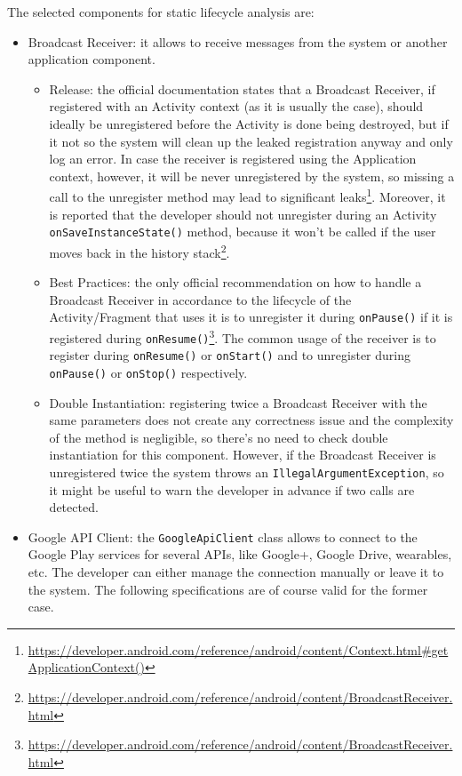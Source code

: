 \documentclass[11pt,a4paper,notitlepage]{article}
\begin{document}
The selected components for static lifecycle analysis are:
\begin{itemize}
	\item Broadcast Receiver: it allows to receive messages from the system or another application component.
	\begin{itemize}
		\item Release: the official documentation states that a Broadcast Receiver, if registered with an Activity context (as it is usually the case), should ideally be unregistered before the Activity is done being destroyed, but if it not so the system will clean up the leaked registration anyway and only log an error. In case the receiver is registered using the Application context, however, it will be never unregistered by the system, so missing a call to the unregister method may lead to significant leaks\footnote{\url{https://developer.android.com/reference/android/content/Context.html\#getApplicationContext()}}. Moreover, it is reported that the developer should not unregister during an Activity \texttt{onSaveInstanceState()} method, because it won't be called if the user moves back in the history stack\footnote{\url{https://developer.android.com/reference/android/content/BroadcastReceiver.html}}.
		\item Best Practices: the only official recommendation on how to handle a Broadcast Receiver in accordance to the lifecycle of the Activity/Fragment that uses it is to unregister it during \texttt{onPause()} if it is registered during \texttt{onResume()}\footnote{\url{https://developer.android.com/reference/android/content/BroadcastReceiver.html}}. The common usage of the receiver is to register during \texttt{onResume()} or \texttt{onStart()} and to unregister during \texttt{onPause()} or \texttt{onStop()} respectively.
		\item Double Instantiation: registering twice a Broadcast Receiver with the same parameters does not create any correctness issue and the complexity of the method is negligible, so there's no need to check double instantiation for this component. However, if the Broadcast Receiver is unregistered twice the system throws an \texttt{IllegalArgumentException}, so it might be useful to warn the developer in advance if two calls are detected.
	\end{itemize}
	\item Google API Client: the \texttt{GoogleApiClient} class allows to connect to the Google Play services for several APIs, like Google+, Google Drive, wearables, etc. The developer can either manage the connection manually or leave it to the system. The following specifications are of course valid for the former case.

\end{itemize}
\end{document}
